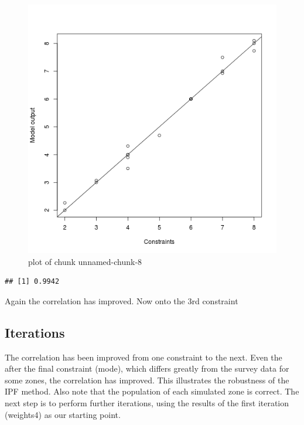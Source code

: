 \begin{figure}[htbp]
\centering
\includegraphics{figure/unnamed-chunk-8.png}
\caption{plot of chunk unnamed-chunk-8}
\end{figure}

\begin{Shaded}
\begin{Highlighting}[]
\NormalTok{(}\NormalTok{(}\NormalTok{(}
\end{Highlighting}
\end{Shaded}
\begin{verbatim}
## [1] 0.9942
\end{verbatim}
Again the correlation has improved. Now onto the 3rd constraint

\subsection{Iterations}

The correlation has been improved from one constraint to the next. Even
the after the final constraint (mode), which differs greatly from the
survey data for some zones, the correlation has improved. This
illustrates the robustness of the IPF method. Also note that the
population of each simulated zone is correct. The next step is to
perform further iterations, using the results of the first iteration
(weights4) as our starting point.


